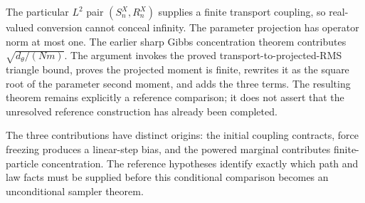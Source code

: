 \documentclass[11pt,a4paper]{article}
\begin{document}
The particular \(L^{2}\) pair \((S_n^X,R_n^X)\) supplies a finite transport coupling, so real-valued conversion cannot conceal infinity. The parameter projection has operator norm at most one. The earlier sharp Gibbs concentration theorem contributes \(\sqrt{d_\theta/(Nm)}\). The argument invokes the proved transport-to-projected-RMS triangle bound, proves the projected moment is finite, rewrites it as the square root of the parameter second moment, and adds the three terms. The resulting theorem remains explicitly a reference comparison; it does not assert that the unresolved reference construction has already been completed.



The three contributions have distinct origins: the initial coupling contracts, force freezing produces a linear-step bias, and the powered marginal contributes finite-particle concentration. The reference hypotheses identify exactly which path and law facts must be supplied before this conditional comparison becomes an unconditional sampler theorem.
\end{document}
